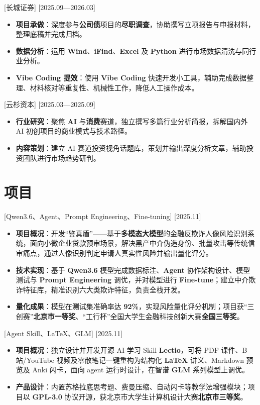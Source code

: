 \documentclass{resume}
\begin{document}
[长城证券]
[2025.09—2026.03]
\begin{itemize}
  \item \textbf{项目承做}：深度参与\textbf{公司债}项目的\textbf{尽职调查}，协助撰写立项报告与申报材料，整理底稿并完成归档。
  \item \textbf{数据分析}：运用 \textbf{Wind}、\textbf{iFind}、\textbf{Excel} 及 \textbf{Python} 进行市场数据清洗与同行业分析。
  \item \textbf{Vibe Coding 提效}：使用 \textbf{Vibe Coding} 快速开发小工具，辅助完成数据整理、材料核对等重复性、机械性工作，降低人工操作成本。
\end{itemize}

[云杉资本]
[2025.03—2025.09]
\begin{itemize}
  \item \textbf{行业研究}：聚焦 \textbf{AI} 与\textbf{消费}赛道，独立撰写多篇行业分析简报，拆解国内外 AI 初创项目的商业模式与技术路径。
  \item \textbf{内容策划}：建立 AI 赛道投资视角话题库，策划并输出深度分析文章，辅助投资团队进行市场趋势研判。
\end{itemize}

\section{项目}

[Qwen3.6、Agent、Prompt Engineering、Fine-tuning]
[2025.11]
\begin{itemize}
  \item \textbf{项目概况}：开发“鉴真盾”——基于\textbf{多模态大模型}的金融反欺诈人像风险识别系统，面向小微企业贷款预审场景，解决黑产中介伪造身份、批量攻击等传统信审痛点，通过人像识别判定申请人真实性风险并输出量化评分。
  \item \textbf{技术实现}：基于 \textbf{Qwen3.6} 模型完成数据标注、\textbf{Agent} 协作架构设计、模型测试与 \textbf{Prompt Engineering} 调优，并对模型进行 \textbf{Fine-tune}；建立中介欺诈特征库，精准识别六大类欺诈特征，负责全栈开发。
  \item \textbf{量化成果}：模型在测试集准确率达 \textbf{92\%}，实现风险量化评分机制；项目获“三创赛”\textbf{北京市一等奖}、“工行杯”全国大学生金融科技创新大赛\textbf{全国三等奖}。
\end{itemize}

[Agent Skill、\LaTeX{}、GLM]
[2025.11]
\begin{itemize}
  \item \textbf{项目概况}：独立设计并开发开源 AI 学习 Skill \textbf{Lectio}，可将 PDF 课件、B 站/YouTube 视频及零散笔记一键重构为结构化 \textbf{\LaTeX{}} 讲义、Markdown 预览及 Anki 闪卡，面向 agent 运行时设计，在智谱 \textbf{GLM} 系列模型上调优。
  \item \textbf{产品设计}：内置苏格拉底思考题、费曼压缩、自动闪卡等教学法增强模块；项目以 \textbf{GPL-3.0} 协议开源，获北京市大学生计算机设计大赛\textbf{北京市三等奖}。
\end{itemize}
\end{document}
